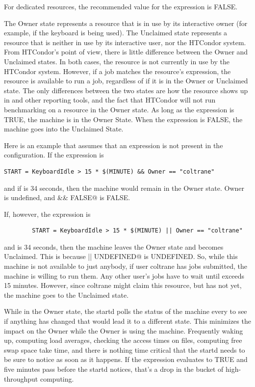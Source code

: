 For dedicated resources, the recommended value for the 
expression is FALSE.

The Owner state represents a resource that is in use by its
interactive owner (for example, if the keyboard is being used).
The Unclaimed state represents a resource that is neither in use by
its interactive user, nor the HTCondor system.
From HTCondor's point of view, there is little difference between the
Owner and Unclaimed states.
In both cases, the resource is not currently in use by the HTCondor
system.
However, if a job matches the resource's  expression, the
resource is available to run a job, regardless of if it is in the
Owner or Unclaimed state.
The only differences between the two states are how the resource shows
up in  and other reporting tools, and the fact that
HTCondor will not run benchmarking on a resource in the Owner state.
As long as the  expression is TRUE, the machine is
in the Owner State.
When the  expression is FALSE, the machine goes into
the Unclaimed State.

Here is an example that assumes that an 
expression is not present in the configuration.
If the  expression is
\begin{verbatim}
START = KeyboardIdle > 15 * $(MINUTE) && Owner == "coltrane" 
\end{verbatim}
and if  is 34 seconds,
then the machine would remain in the Owner state.
Owner is undefined, and
\verb@anything && FALSE@ is FALSE.

If, however, the  expression is
\begin{verbatim}
        START = KeyboardIdle > 15 * $(MINUTE) || Owner == "coltrane"
\end{verbatim}
and  is 34 seconds, then the machine
leaves the Owner state and becomes Unclaimed.
This is because
\verb@FALSE || UNDEFINED@ is UNDEFINED.
So, while this machine is not available to just anybody,
if user coltrane has jobs submitted, the machine is willing to run them.
Any other user's jobs have to wait
until  exceeds 15 minutes.
However, since coltrane might claim this resource,
but has not yet, the machine goes to the Unclaimed state.

While in the Owner state, the startd polls the status of the
machine every  to see if anything has changed
that would lead it to a different state.
This minimizes the impact on the Owner
while the Owner is using the machine.
Frequently waking up, computing load averages, checking the access
times on files, computing free swap space take time,
and there is nothing
time critical that the startd needs to be sure to notice as soon as it
happens.
If the  expression evaluates to TRUE and five
minutes pass before the startd notices,
that's a drop in the bucket of high-throughput computing.

